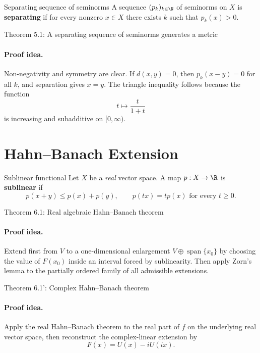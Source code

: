 \documentclass[11pt]{article}
\begin{document}
\begin{defbox}{Separating sequence of seminorms}
A sequence $(p_k)_{k\in\N}$ of seminorms on $X$ is \textbf{separating} if for every nonzero $x\in X$ there exists $k$ such that $p_k(x)>0$.
\end{defbox}

\begin{thmbox}{Theorem 5.1: A separating sequence of seminorms generates a metric}
\thmFrechetMetric
\end{thmbox}

\paragraph{Proof idea.}
Non-negativity and symmetry are clear. If $d(x,y)=0$, then $p_k(x-y)=0$ for all $k$, and separation gives $x=y$. The triangle inequality follows because the function
\[
t\mapsto \frac{t}{1+t}
\]
is increasing and subadditive on $[0,\infty)$.

\section{Hahn--Banach Extension}

\begin{defbox}{Sublinear functional}
Let $X$ be a \emph{real} vector space. A map $p:X\to\R$ is \textbf{sublinear} if
\[
p(x+y)\le p(x)+p(y),
\qquad
p(t x)=t p(x) \text{ for every } t\ge 0.
\]
\end{defbox}

\begin{thmbox}{Theorem 6.1: Real algebraic Hahn--Banach theorem}
\thmHahnBanachReal
\end{thmbox}

\paragraph{Proof idea.}
Extend first from $V$ to a one-dimensional enlargement $V\oplus \operatorname{span}\{x_0\}$ by choosing the value of $F(x_0)$ inside an interval forced by sublinearity. Then apply Zorn's lemma to the partially ordered family of all admissible extensions.

\begin{thmbox}{Theorem 6.1': Complex Hahn--Banach theorem}
\thmHahnBanachComplex
\end{thmbox}

\paragraph{Proof idea.}
Apply the real Hahn--Banach theorem to the real part of $f$ on the underlying real vector space, then reconstruct the complex-linear extension by
\[
F(x)=U(x)-iU(ix).
\]
\end{document}
